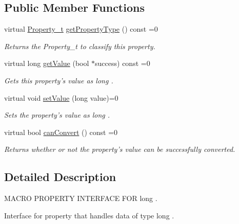 \subsection*{Public Member Functions}
\begin{DoxyCompactItemize}
\item 
virtual \hyperlink{group___property_classes_ga38f1ccddda12c7cb50b868c9f789ee37}{Property\-\_\-t} \hyperlink{class_i_long_property_aff0812e50e088884a74f646f3fb3c3e7}{get\-Property\-Type} () const =0
\begin{DoxyCompactList}\small\item\em Returns the Property\-\_\-t to classify this property. \end{DoxyCompactList}\item 
virtual long \hyperlink{class_i_long_property_a52a9796a321b4453f1162fe46746bbcd}{get\-Value} (bool $\ast$success) const =0
\begin{DoxyCompactList}\small\item\em Gets this property's value as long . \end{DoxyCompactList}\item 
virtual void \hyperlink{class_i_long_property_af9aeb97712cedf69e3d517a4680ed4c2}{set\-Value} (long value)=0
\begin{DoxyCompactList}\small\item\em Sets the property's value as long . \end{DoxyCompactList}\item 
virtual bool \hyperlink{class_i_long_property_ad6eb15873636142deab4423de11e1ef8}{can\-Convert} () const =0
\begin{DoxyCompactList}\small\item\em Returns whether or not the property's value can be successfully converted. \end{DoxyCompactList}\end{DoxyCompactItemize}


\subsection{Detailed Description}
M\-A\-C\-R\-O P\-R\-O\-P\-E\-R\-T\-Y I\-N\-T\-E\-R\-F\-A\-C\-E F\-O\-R long . 

Interface for property that handles data of type long . 

